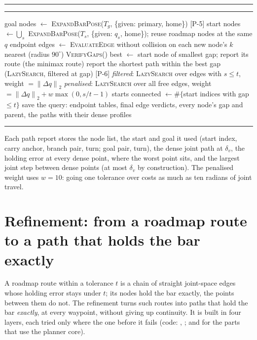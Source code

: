\documentclass[11pt,a4paper]{article}
\newcommand{\dtag}[1]{\hfill\textcolor{diff}{\scriptsize\textsf{[#1]}}}
\newenvironment{algo}[2]{%
  \par\medskip\noindent\rule{\linewidth}{0.8pt}\par
  \captionof{algorithm}{#1}\label{#2}%
  \vspace{-4pt}\noindent\rule{\linewidth}{0.4pt}\par\vspace{-2pt}
  \begin{algorithmic}[1]}%
 {\end{algorithmic}\vspace{-2pt}\noindent\rule{\linewidth}{0.8pt}\par\medskip}
\newcommand{\norm}[1]{\left\lVert #1 \right\rVert}
\newcommand{\fn}[1]{\textsc{#1}}
\begin{document}
\begin{algo}{\textsc{QueryRoadmap} --- \texttt{query\_roadmap}}{alg:query}
  \State goal nodes $\gets$ \fn{ExpandBarPose}($T_g$, \{given: primary, home\}) \dtag{P-5}
  \State start nodes $\gets \bigcup_s$ \fn{ExpandBarPose}($T_s$, \{given: $q_s$, home\}); reuse roadmap nodes at the same $q$
  \State endpoint edges $\gets$ \fn{EvaluateEdge} without collision on each new node's $k$ nearest (radius $90^\circ$)
  \State \fn{VerifyGaps}() 
  \State best $\gets$ start node of smallest gap; report its route (the minimax route)
  \State report the shortest path within the best gap (\fn{LazySearch}, filtered at gap)
   \dtag{P-6}
    \State \emph{filtered}: \fn{LazySearch} over edges with $s \le t$, weight $= \norm{\Delta q}_2$
    \State \emph{penalised}: \fn{LazySearch} over all free edges, weight $= \norm{\Delta q}_2 + w \max(0, s/t - 1)$
    \State starts connected $\gets \#\{$start indices with gap $\le t\}$
  \EndFor
  \State save the query: endpoint tables, final edge verdicts, every node's gap and parent, the paths with their dense profiles
\EndFunction
\end{algo}

\noindent
Each path report stores the node list, the start and goal it used (start index,
carry anchor, branch pair, turn; goal pair, turn), the dense joint path at
$\delta_v$, the holding error at every dense point, where the worst point sits,
and the largest joint step between dense points (at most $\delta_v$ by
construction). The penalised weight uses $w = 10$: going one tolerance over
costs as much as ten radians of joint travel.

\section{Refinement: from a roadmap route to a path that holds the bar exactly}
\label{sec:refine}

A roadmap route within a tolerance $t$ is a chain of straight joint-space edges
whose holding error stays under $t$; its nodes hold the bar exactly, the points
between them do not. The refinement turns such routes into paths that hold the
bar \emph{exactly}, at every waypoint, without giving up continuity. It is built
in four layers, each tried only where the one before it fails (code:
, ; 
and  for the parts that use the planner
core).
\end{document}
